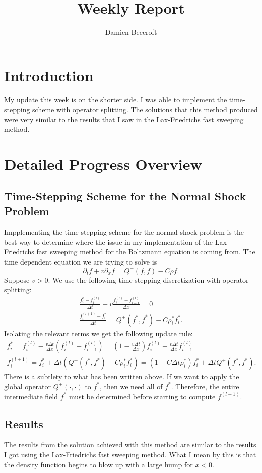 \documentclass{article}
\title{Weekly Report}
\author{Damien Beecroft}
\begin{document}
\maketitle
\section{Introduction}
My update this week is on the shorter side. I was able to implement the time-stepping scheme with operator splitting. The solutions that this method produced were very similar to the results that I saw in the Lax-Friedrichs fast sweeping method.
\section{Detailed Progress Overview}
\subsection{Time-Stepping Scheme for the Normal Shock Problem}
Impplementing the time-stepping scheme for the normal shock problem is the best way to determine where the issue in my implementation of the Lax-Friedrichs fast sweeping method for the Boltzmann equation is coming from. The time dependent equation we are trying to solve is
\[
    \partial_t f + v \partial_x f = Q^+(f,f) - C \rho f.
\]
Suppose $v > 0$. We use the following time-stepping discretization with operator splitting:
\begin{gather*}
    \frac{f_i^* - f_i^{(l)}}{\Delta t} + v \frac{f_i^{(l)} - f_{i-1}^{(l)}}{\Delta x} = 0\\
    \frac{f_i^{(l+1)} - f^*_i}{\Delta t} = Q^+(f^*,f^*) - C \rho_i^* f^*_i.
\end{gather*}
Isolating the relevant terms we get the following update rule:
\begin{gather*}
    f_i^* = f_i^{(l)} - \frac{v \Delta t}{\Delta x} (f_i^{(l)} - f_{i-1}^{(l)}) = \left(1 - \frac{v \Delta t}{\Delta x} \right)f_i^{(l)} + \frac{v \Delta t}{\Delta x}  f_{i-1}^{(l)}\\
    f_i^{(l+1)} = f^*_i + \Delta t (Q^+(f^*,f^*) - C \rho_i^* f^*_i) = (1 - C \Delta t \rho_i^*) f^*_i + \Delta t Q^+(f^*,f^*) .
\end{gather*}
There is a subtlety to what has been written above. If we want to apply the global operator $Q^+(\cdot, \cdot)$ to $f^*$, then we need all of $f^*$. Therefore, the entire intermediate field $f^*$ must be determined before starting to compute $f^{(l+1)}$.
\subsection{Results}
The results from the solution achieved with this method are similar to the results I got using the Lax-Friedrichs fast sweeping method. What I mean by this is that the density function begins to blow up with a large hump for $x<0$.
\end{document}
